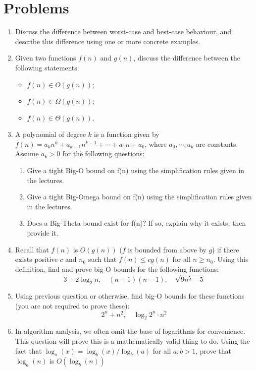 \newpage

\section{Problems}

\begin{enumerate}
  \item Discuss the difference between worst-case and best-case behaviour, and describe this difference using one or more concrete examples.
  \item Given two functions $f(n)$ and $g(n)$, discuss the difference between the following statements:
    \begin{itemize}
      \item $f(n) \in O(g(n))$;
      \item $f(n) \in \Omega(g(n))$;
      \item $f(n) \in \Theta(g(n))$.
    \end{itemize}
  \item A polynomial of degree $k$ is a function given by $f(n) = a_{k}n^{k} + a_{k - 1}n^{k - 1} + \cdots + a_{1}n + a_{0}$, where $a_{0}, \cdots, a_{k}$ are constants. 
    Assume $a_{k} > 0$ for the following questions:
    \begin{enumerate}
      \item Give a tight Big-O bound on f(n) using the simplification rules given in the lectures.
      \item Give a tight Big-Omega bound on f(n) using the simplification rules given in the lectures.
      \item Does a Big-Theta bound exist for f(n)? If so, explain why it exists, then provide it.
    \end{enumerate}
  \item Recall that $f(n)$ is $O(g(n))$ ($f$ is bounded from above by $g$) if there exists positive $c$ and $n_0$ such that $f(n) \le cg(n)$ for all $n \ge n_0$. Using this definition, find and prove big-O bounds for the following functions:
    $$3 + 2 \log_{2}{n}, \quad (n + 1)(n - 1), \quad \sqrt{9n^{5} - 5}$$
  \item Using previous question or otherwise, find big-O bounds for these functions (you are not required to prove these):
    $$2^{n}+n^{2}, \quad \log_{2}{2^{n} \cdot n^{2}}$$
  \item In algorithm analysis, we often omit the base of logarithms for convenience. This question will prove this is a mathematically valid thing to do.
    Using the fact that $\log_{a}(x) = \log_{b}(x)/\log_{b}(a)$ for all $a, b > 1$, prove that $\log_{a}(n)$ is $O(\log_{b}(n))$

\end{enumerate}
